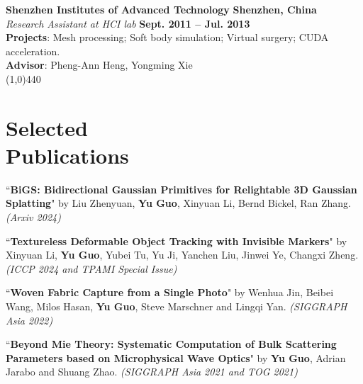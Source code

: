 \documentclass[margin,line]{resume}
\begin{document}
\begin{resume}
    \vspace{0.0mm}
    
    \textbf{Shenzhen Institutes of Advanced Technology}   \hfill \textbf{Shenzhen, China} \\
    \textsl{Research Assistant at HCI lab} \hfill \textbf{Sept. 2011 -- Jul. 2013} \\
    \textbf{Projects}: Mesh processing; Soft body simulation; Virtual surgery; CUDA acceleration. \\
    \textbf{Advisor}: Pheng-Ann Heng, Yongming Xie \\

	\vspace{-5.0mm}
	\line(1,0){440}
	\vspace{-5.0mm}
	
	\section{\mysidestyle Selected \\Publications}

	``\textbf{BiGS: Bidirectional Gaussian Primitives for Relightable 3D Gaussian Splatting}" 
	by Liu Zhenyuan, \textbf{Yu Guo}, Xinyuan Li, Bernd Bickel, Ran Zhang.
	\textsl{(Arxiv 2024)}\\
	
	\vspace{-5mm}

	``\textbf{Textureless Deformable Object Tracking with Invisible Markers}" 
	by Xinyuan Li, \textbf{Yu Guo}, Yubei Tu, Yu Ji, Yanchen Liu, Jinwei Ye, Changxi Zheng.
	\textsl{(ICCP 2024 and TPAMI Special Issue)}\\
	
	\vspace{-5mm}
	
	``\textbf{Woven Fabric Capture from a Single Photo}" 
	by Wenhua Jin, Beibei Wang, Milos Hasan, \textbf{Yu Guo}, Steve Marschner and Lingqi Yan. 
	\textsl{(SIGGRAPH Asia 2022)}\\
	
	\vspace{-5mm}
	
	``\textbf{Beyond Mie Theory: Systematic Computation of Bulk Scattering Parameters based on Microphysical Wave Optics}" 
	by \textbf{Yu Guo}, Adrian Jarabo and Shuang Zhao. 
	\textsl{(SIGGRAPH Asia 2021 and TOG 2021)}\\
	

\end{resume}
\end{document}
